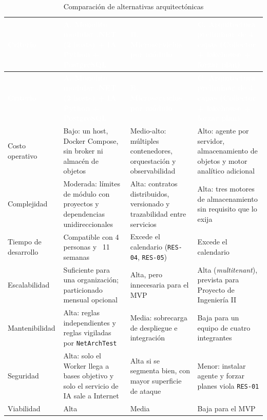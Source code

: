 \documentclass[12pt,a4paper]{article}
\begin{document}
\begingroup
{}
\scriptsize
\begin{longtable}{p{} p{} p{} p{}}
\toprule
\rowcolor{utbblue}
\textcolor{white}{\textbf{Criterio}} & \textcolor{white}{\textbf{A. Monolito modular .NET (2 hosts) + IA Python + PostgreSQL}} & \textcolor{white}{\textbf{B. Microservicios por módulo}} & \textcolor{white}{\textbf{C. Arquitectura preliminar de 4 capas (Collector + lakehouse + forzar plan)}} \\
\midrule
\endfirsthead
\toprule
\rowcolor{utbblue}
\textcolor{white}{\textbf{Criterio}} & \textcolor{white}{\textbf{A. Monolito modular .NET (2 hosts) + IA Python + PostgreSQL}} & \textcolor{white}{\textbf{B. Microservicios por módulo}} & \textcolor{white}{\textbf{C. Arquitectura preliminar de 4 capas (Collector + lakehouse + forzar plan)}} \\
\midrule
\endhead
\bottomrule
\caption{Comparación de alternativas arquitectónicas}
\label{tab:alternativas}
\endlastfoot
Costo operativo & Bajo: un host, Docker Compose, sin broker ni almacén de objetos & Medio-alto: múltiples contenedores, orquestación y observabilidad & Alto: agente por servidor, almacenamiento de objetos y motor analítico adicional \\
Complejidad & Moderada: límites de módulo con proyectos y dependencias unidireccionales & Alta: contratos distribuidos, versionado y trazabilidad entre servicios & Alta: tres motores de almacenamiento sin requisito que lo exija \\
Tiempo de desarrollo & Compatible con 4 personas y ~11 semanas & Excede el calendario (\texttt{RES-04}, \texttt{RES-05}) & Excede el calendario \\
Escalabilidad & Suficiente para una organización; particionado mensual opcional & Alta, pero innecesaria para el MVP & Alta (\textit{multitenant}), prevista para Proyecto de Ingeniería II \\
Mantenibilidad & Alta: reglas independientes y reglas vigiladas por \texttt{NetArchTest} & Media: sobrecarga de despliegue e integración & Baja para un equipo de cuatro integrantes \\
Seguridad & Alta: solo el Worker llega a bases objetivo y solo el servicio de IA sale a Internet & Alta si se segmenta bien, con mayor superficie de ataque & Menor: instalar agente y forzar planes viola \texttt{RES-01} \\
Viabilidad & Alta & Media & Baja para el MVP \\
\end{longtable}
\endgroup
\end{document}
